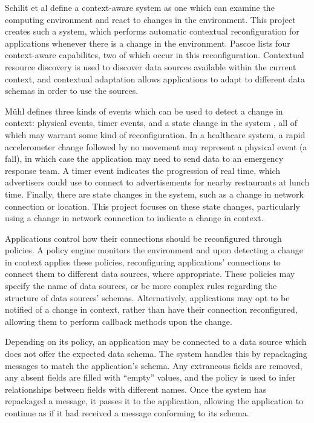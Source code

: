 \documentclass[12pt,twoside,notitlepage]{report}
\begin{document}
Schilit et al \cite{schilit1994context}  define a context-aware system as one which can examine the computing environment and react to changes in the environment. 
This project creates such a system, which performs automatic contextual reconfiguration for applications whenever there is a change in the environment. 
Pascoe \cite{pascoe1998adding} lists four context-aware capabilites, two of which occur in this reconfiguration. 
Contextual resource discovery is used to discover data sources available within the current context, and contextual adaptation allows applications to adapt to different data schemas in order to use the sources. 

M\"{u}hl defines three kinds of events which can be used to detect a change in context: physical events, timer events, and a state change in the system \cite[page 11]{muhl2006distributed}, all of which may warrant some kind of reconfiguration. 
In a healthcare system, a rapid accelerometer change followed by no movement may represent a physical event (a fall), in which case the application may need to send data to an emergency response team.
A timer event indicates the progression of real time, which advertisers could use to connect to advertisements for nearby restaurants at lunch time. 
Finally, there are state changes in the system, such as a change in network connection or location. 
This project focuses on these state changes, particularly using a change in network connection to indicate a change in context. 

Applications control how their connections should be reconfigured through policies. 
A policy engine monitors the environment and upon detecting a change in context applies these policies, reconfiguring applications' connections to connect them to different data sources, where appropriate.
These policies may specify the name of data sources, or be more complex rules regarding the structure of data sources' schemas. 
Alternatively, applications may opt to be notified of a change in context, rather than have their connection reconfigured, allowing them to perform callback methods upon the change.

Depending on its policy, an application may be connected to a data source which does not offer the expected data schema. 
The system handles this by repackaging messages to match the application's schema. Any extraneous fields are removed, any absent fields are filled with ``empty'' values, and the policy is used to infer relationships between fields with different names. 
Once the system has repackaged a message, it passes it to the application, allowing the application to continue as if it had received a message conforming to its schema.
\end{document}
